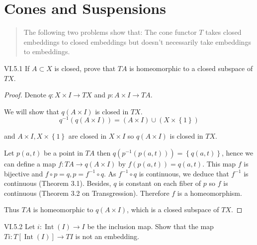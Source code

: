\section{Cones and Suspensions}

\begin{quotation}
	The following two problems show that: The cone functor \( T \) takes closed embeddings to closed embeddings but doesn't necessarily take embeddings to embeddings.
\end{quotation}

\begin{problem}{VI.5.1}
If \( A \subset X \) is closed, prove that \( TA \) is homeomorphic to a closed subspace of \( TX \).
\end{problem}

\begin{proof}
	Denote \( q: X \times I \to TX \) and \( p: A \times I \to TA \).

	We will show that \( q(A \times I) \) is closed in \( TX \).
	\[
		q^{-1}(q(A \times I)) = (A \times I) \cup (X \times \left\{ 1 \right\})
	\]

	and \( A \times I, X \times \left\{ 1 \right\} \) are closed in \( X \times I \) so \( q(A \times I) \) is closed in \( TX \).

	Let \( p(a, t) \) be a point in \( TA \) then \( q(p^{-1}(p(a, t))) = \left\{ q(a, t) \right\} \), hence we can define a map \( f: TA \to q(A \times I) \) by \( f(p(a, t)) = q(a, t) \). This map \( f \) is bijective and \( f \circ p = q, p = f^{-1} \circ q \). As \( f^{-1} \circ q \) is continuous, we deduce that \( f^{-1} \) is continuous (Theorem 3.1). Besides, \( q \) is constant on each fiber of \( p \) so \( f \) is continuous (Theorem 3.2 on Transgression). Therefore \( f \) is a homeomorphism.

	Thus \( TA \) is homeomorphic to \( q(A\times I) \), which is a closed subspace of \( TX \).
\end{proof}

\begin{problem}{VI.5.2}
Let \( i: \operatorname{Int}(I) \to I \) be the inclusion map. Show that the map \( Ti: T[\operatorname{Int}(I)] \to TI \) is not an embedding.
\end{problem}

